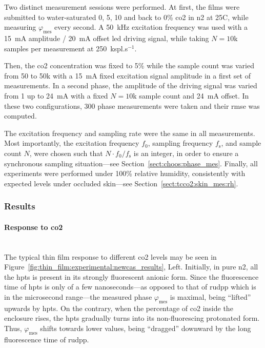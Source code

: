 Two distinct measurement sessions were performed. At first, the films were submitted to water-saturated 0, 5, 10 and back to 0\% \gls{co2} in \gls{n2} at 25{\degree}C, while measuring $\varphi_\text{mes}$ every second. A 50~kHz excitation frequency was used with a 15~mA amplitude / 20~mA offset \gls{led} driving signal, while taking $N=10$k samples per measurement at 250~kspl.s$^{-1}$.

Then, the \gls{co2} concentration was fixed to 5\% while the sample count was varied from 50 to 50k with a 15~mA fixed excitation signal amplitude in a first set of measurements. In a second phase, the amplitude of the driving signal was varied from 1 up to 24~mA with a fixed $N=10$k sample count and 24~mA offset. In these two configurations, 300 phase measurements were taken and their \gls{rmse} was computed.

The excitation frequency and sampling rate were the same in all measurements. Most importantly, the excitation frequency $f_0$, sampling frequency $f_\text{s}$, and sample count $N$, were chosen such that $N\cdot f_0/f_\text{s}$ is an integer, in order to ensure a synchronous sampling situation---see Section~\ref{sect:choos:phase_mes}. Finally, all experiments were performed under 100\% relative humidity, consistently with expected levels under occluded skin---see Section~\ref{sect:tcco2:skin_mes:rh}.

\subsubsection{Results}

\paragraph{Response to \gls{co2}}\mbox{}\\

The typical thin film response to different \gls{co2} levels may be seen in Figure~\ref{fig:thin_film:experimental:newcas_results}, Left. Initially, in pure \gls{n2}, all the \gls{hpts} is present in its strongly fluorescent anionic form. Since the fluorescence time of \gls{hpts} is only of a few nanoseconds---as opposed to that of \gls{rudpp} which is in the microsecond range---the measured phase $\varphi_\text{mes}$ is maximal, being \enquote{lifted} upwards by \gls{hpts}. On the contrary, when the percentage of \gls{co2} inside the enclosure rises, the \gls{hpts} gradually turns into its non-fluorescing protonated form. Thus, $\varphi_\text{mes}$ shifts towards lower values, being \enquote{dragged} downward by the long fluorescence time of \gls{rudpp}.

